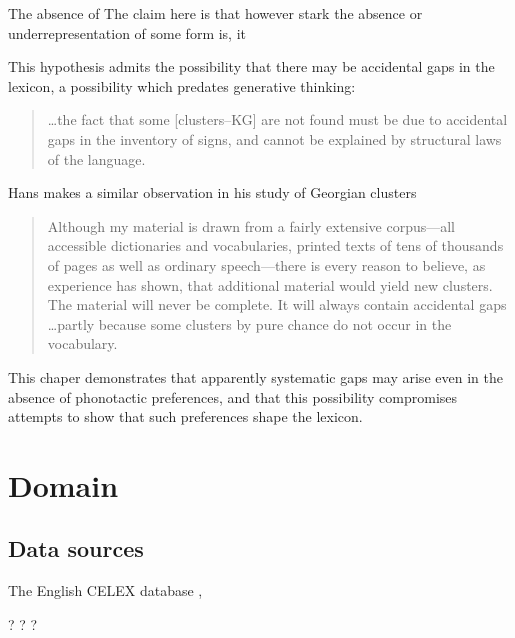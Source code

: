 The absence of 
The claim here is that however stark the absence or underrepresentation of some form is, it 

This hypothesis admits the possibility that there may be accidental gaps in the lexicon, a possibility which predates generative thinking:

\begin{quote}
\ldots{}the fact that some [clusters--KG] are not found must be due to accidental gaps in the inventory of signs, and cannot be explained by structural laws of the language. \citep[][16]{Fischer-Jorgensen1952}
\end{quote}

\noindent
Hans \citeauthor{Vogt1954} makes a similar observation in his study of Georgian clusters

\begin{quote}
Although my material is drawn from a fairly extensive corpus---all accessible dictionaries and vocabularies, printed texts of tens of thousands of pages as well as ordinary speech---there is every reason to believe, as experience has shown, that additional material would yield new clusters. The material will never be complete. It will always contain accidental gaps \ldots partly because some clusters by pure chance do not occur in the vocabulary. \citep[][30]{Vogt1954}
\end{quote}

\citet{Chomsky1965}

This chaper demonstrates that apparently systematic gaps may arise even in the absence of phonotactic preferences, and that this possibility compromises attempts to show that such preferences shape the lexicon. 

\section{Domain}


\subsection{Data sources}

The English CELEX database \citep{CELEX},

\citet{Aronoff1976}

\citet{Harley2009}

\citet{Taft1975} ?
\citet{Taft1981} ?
\citet{Taft2004a} ?

